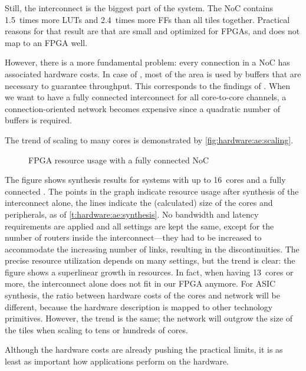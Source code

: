 Still, the interconnect is the biggest part of the system.
The \ac{NoC} contains 1.5~times more \acp{LUT} and 2.4~times more \acp{FF} than all \MicroBlaze tiles together.
Practical reasons for that result are that \MicroBlazes are small and optimized for \acp{FPGA}, and \aethereal does not map to an \ac{FPGA} well.

However, there is a more fundamental problem: every connection in a  \ac{NoC} has associated hardware costs.
In case of \aethereal*, most of the area is used by buffers that are necessary to guarantee throughput.
This corresponds to the findings of \citet{goossens:aethereal}.
When we want to have a fully connected interconnect for all core-to-core channels, a connection-oriented network becomes expensive since a quadratic number of buffers is required.

\label{s:hardware:ae:scaling_problem}

The trend of scaling to many cores is demonstrated by \vref{fig:hardware:ae:scaling}.
\begin{figure}%
%
\caption{\acs{FPGA} resource usage with a fully connected \aethereal \acs{NoC}}%
\label{fig:hardware:ae:scaling}%
\end{figure}%
The figure shows synthesis results for systems with up to 16~cores and a fully connected \aethereal.
The points in the graph indicate resource usage after synthesis of the interconnect alone, the lines indicate the (calculated) size of the cores and peripherals, as of \vref{t:hardware:ae:synthesis}.
No bandwidth and latency requirements are applied and all settings are kept the same, except for the number of routers inside the interconnect---they had to be increased to accommodate the increasing number of links, resulting in the discontinuities.
The precise resource utilization depends on many settings, but the trend is clear: the figure shows a superlinear growth in resources.
In fact, when having 13~cores or more, the interconnect alone does not fit in our \ac{FPGA} anymore.
For \ac{ASIC} synthesis, the ratio between hardware costs of the cores and network will be different, because the hardware description is mapped to other technology primitives.
However, the trend is the same; the network will outgrow the size of the tiles when scaling to tens or hundreds of cores.

Although the hardware costs are already pushing the practical limits, it is as least as important how applications perform on the hardware.

